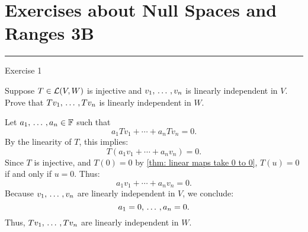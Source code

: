 \section*{Exercises about Null Spaces and Ranges 3B}
\hrule
\phantom{.}


\begin{xrcs}
  Exercise 1
\end{xrcs}
\setcounter{xrcscount}{8}
%

\setcounter{xrcscount}{7}
\begin{xrcs} %
  Suppose $T \in \mathcal{L}(V,W)$ is injective and $v_1, {\, \ldots \,\,}, v_n$ is linearly independent in $V$. Prove that $Tv_1, {\, \ldots \,\,}, Tv_n$ is linearly independent in $W$.

  \begin{xprf}
    Let $a_1, {\, \ldots \,\,}, a_n \in \mathbb{F}$ such that
    \[
    a_1 Tv_1 + \cdots + a_n Tv_n = 0.
    \]
    By the linearity of $T$, this implies:
    \[
    T(a_1 v_1 + \cdots + a_n v_n) = 0.
    \]
    Since $T$ is injective, and $T(0)=0$ by \ref{thm: linear maps take 0 to 0}, \( T(u) = 0 \) if and only if \( u = 0 \). Thus:
    \[
    a_1 v_1 + \cdots + a_n v_n = 0.
    \]
    Because $v_1, {\, \ldots \,\,}, v_n$ are linearly independent in $V$, we conclude:
    \[
    a_1 = 0, {\, \ldots \,\,}, a_n = 0.
    \]
    Thus, $Tv_1, {\, \ldots \,\,}, Tv_n$ are linearly independent in $W$.
  \end{xprf}
\end{xrcs}

